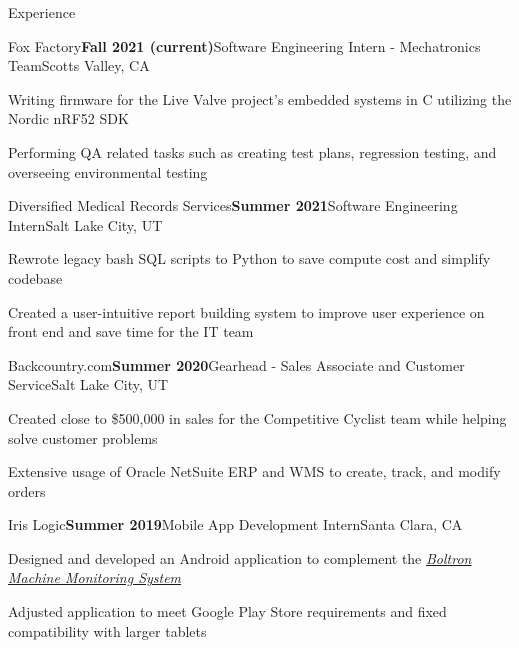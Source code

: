 \documentclass{resume}
\begin{document}
\begin{rSection}{\large Experience}

\begin{rSubsection}{Fox Factory}{\bf{Fall 2021 (current)}}{Software Engineering Intern - Mechatronics Team}{Scotts Valley, CA }
\item Writing firmware for the Live Valve project's embedded systems in C utilizing the Nordic nRF52 SDK
\item Performing QA related tasks such as creating test plans, regression testing, and overseeing environmental testing
\end{rSubsection}

\begin{rSubsection}{Diversified Medical Records Services}{\bf{Summer 2021}}{Software Engineering Intern}{Salt Lake City, UT }
\item Rewrote legacy bash SQL scripts to Python to save compute cost and simplify codebase
\item Created a user-intuitive report building system to improve user experience on front end and save time for the IT team
\end{rSubsection}

\begin{rSubsection}{Backcountry.com}{\bf{Summer 2020}}{Gearhead - Sales Associate and Customer Service}{Salt Lake City, UT }
\item Created close to \$500,000 in sales for the Competitive Cyclist team while helping solve customer problems
\item Extensive usage of Oracle NetSuite ERP and WMS to create, track, and modify orders
\end{rSubsection}

\begin{rSubsection}{Iris Logic}{\bf{Summer 2019}}{Mobile App Development Intern}{Santa Clara, CA }
 \item Designed and developed an Android application to complement the \emph{\href{https://irislogic.com/boltron-machine-monitoring-system/}{Boltron Machine Monitoring System}}
\item Adjusted application to meet Google Play Store requirements and fixed compatibility with larger tablets
\end{rSubsection}

\end{rSection}
\end{document}
